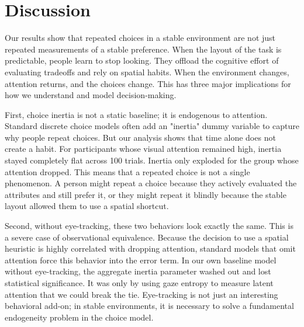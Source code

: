 \section*{Discussion}

Our results show that repeated choices in a stable environment are not just repeated measurements of a stable preference. When the layout of the task is predictable, people learn to stop looking. They offload the cognitive effort of evaluating tradeoffs and rely on spatial habits. When the environment changes, attention returns, and the choices change. This has three major implications for how we understand and model decision-making.

First, choice inertia is not a static baseline; it is endogenous to attention. Standard discrete choice models often add an "inertia" dummy variable to capture why people repeat choices. But our analysis shows that time alone does not create a habit. For participants whose visual attention remained high, inertia stayed completely flat across 100 trials. Inertia only exploded for the group whose attention dropped. This means that a repeated choice is not a single phenomenon. A person might repeat a choice because they actively evaluated the attributes and still prefer it, or they might repeat it blindly because the stable layout allowed them to use a spatial shortcut. 

Second, without eye-tracking, these two behaviors look exactly the same. This is a severe case of observational equivalence. Because the decision to use a spatial heuristic is highly correlated with dropping attention, standard models that omit attention force this behavior into the error term. In our own baseline model without eye-tracking, the aggregate inertia parameter washed out and lost statistical significance. It was only by using gaze entropy to measure latent attention that we could break the tie. Eye-tracking is not just an interesting behavioral add-on; in stable environments, it is necessary to solve a fundamental endogeneity problem in the choice model.

